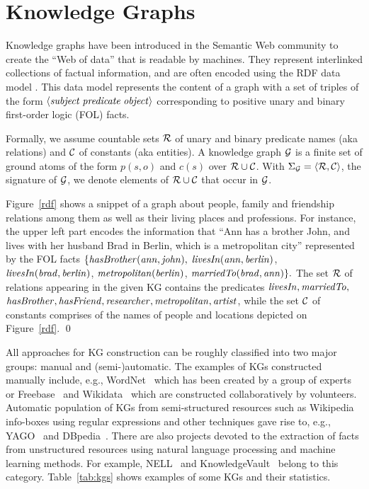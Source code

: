 \section{Knowledge Graphs}
\label{sec:kgs}

Knowledge graphs have been introduced in the Semantic Web community to create the ``Web of data'' that %
is readable by machines. They represent interlinked collections of factual information, and are often encoded using the RDF data model \cite{rdf2004}. This data model represents the content of a graph with a set of triples of the form $\langle\mathit{subject\;predicate\;object}\rangle$ corresponding to positive unary and binary first-order logic (FOL) facts.  

Formally, we assume countable sets $\mathcal{R}$ of unary and binary predicate names (aka relations) and $\mathcal{C}$ of constants (aka entities). A knowledge graph $\mathcal{G}$ is a finite set of ground atoms of the form $p(s,o)$ and $c(s)$ over $\mathcal{R} \cup \mathcal{C}$. With $\Sigma_{\mathcal{G}}=\langle\mathcal{R},\mathcal{C}\rangle$, the signature of $\mathcal{G}$, we denote elements of $\mathcal{R} \cup \mathcal{C}$ that occur in $\mathcal{G}$.

\begin{example} Figure~\ref{rdf} shows a snippet of a graph about people, family and friendship %
relations among them as well as their living places and professions. For instance, the upper left part encodes the information that ``Ann has a brother John, and lives with her husband Brad in Berlin, which is a metropolitan city'' represented by the FOL facts $\{\mathit{hasBrother(ann, john),}$ $\mathit{ livesIn(ann, berlin)}$, \\$\mathit{livesIn(brad, berlin)}$, $\mathit{metropolitan(berlin)}$, $\mathit{marriedTo(brad, ann)}\}.$
The set $\mathcal{R}$ of relations appearing in the given KG contains the predicates $\mathit{livesIn,marriedTo,}$\\$\mathit{hasBrother,hasFriend,researcher,metropolitan,artist}$, while the set $\mathcal{C}$ of constants comprises of the names of people and locations depicted on Figure~\ref{rdf}. \qed
\end{example}



All approaches for KG construction can be roughly classified into two major groups: manual and (semi-)automatic. The examples of KGs constructed manually include, e.g., WordNet~\cite{wordnet} which has been created by a group of experts or Freebase~\cite{Freebase} and Wikidata~\cite{wikidata} which are constructed collaboratively by volunteers. 
Automatic population of KGs from semi-structured resources such as Wikipedia info-boxes using regular expressions and other techniques gave rise to, e.g., YAGO~\cite{yago} and DBpedia~\cite{dbpedia}. 
There are also projects 
devoted to the extraction of facts from unstructured resources using natural language processing and machine learning methods.  
For example, NELL~\cite{nell} and KnowledgeVault~\cite{KnowledgeVault} belong to this category. Table~\ref{tab:kgs} shows examples of some KGs and their statistics.

